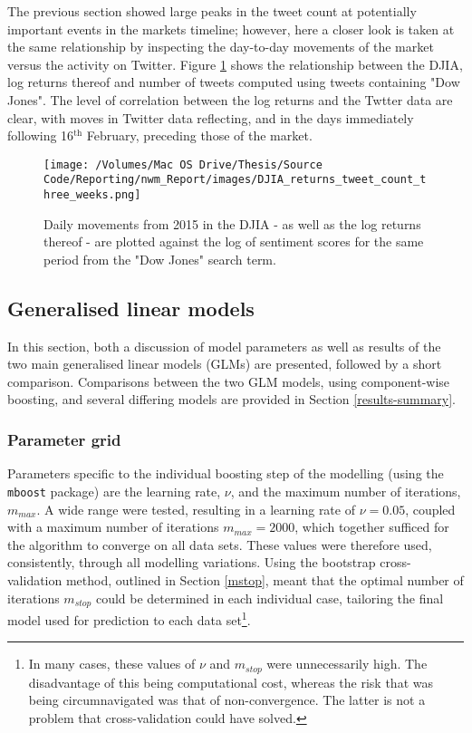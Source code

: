\documentclass{article}
\begin{document}
The previous section showed large peaks in the tweet count at potentially important events in the markets timeline; however, here a closer look is taken at the same relationship by inspecting the day-to-day movements of the market versus the activity on Twitter. Figure \ref{fig:day-to-day} shows the relationship between the DJIA, log returns thereof and number of tweets computed using tweets containing "Dow Jones". The level of correlation between the log returns and the Twtter data are clear, with moves in Twitter data reflecting, and in the days immediately following 16$^{\text{th}}$ February, preceding those of the market.

\begin{figure}[htb]
\centering
\texttt{[image: /Volumes/Mac OS Drive/Thesis/Source Code/Reporting/nwm\_Report/images/DJIA\_returns\_tweet\_count\_three\_weeks.png]}
\caption[DJIA log-returns plotted alongside the logarithm of tweet counts]{\label{fig:day-to-day}Daily movements from 2015 in the DJIA - as well as the log returns thereof - are plotted against the log of sentiment scores for the same period from the "Dow Jones" search term.}
\end{figure}

\pagebreak


\subsection{Generalised linear models \label{main-modelling}}
\label{sec-6-4}

In this section, both a discussion of model parameters as well as results of the two main generalised linear models (GLMs) are presented, followed by a short comparison. Comparisons between the two GLM models, using component-wise boosting, and several differing models are provided in Section \ref{results-summary}.


\subsubsection{Parameter grid \label{param-grid}}
\label{sec-6-4-1}

Parameters specific to the individual boosting step of the modelling (using the \texttt{mboost} package) are the learning rate, $\nu$, and the maximum number of iterations, $m_{max}$. A wide range were tested, resulting in a learning rate of $\nu = 0.05$, coupled with a maximum number of iterations $m_{max} = 2000$, which together sufficed for the algorithm to converge on all data sets. These values were therefore used, consistently, through all modelling variations. Using the bootstrap cross-validation method, outlined in Section \ref{mstop}, meant that the optimal number of iterations $m_{stop}$ could be determined in each individual case, tailoring the final model used for prediction to each data set\footnote{In many cases, these values of $\nu$ and $m_{stop}$ were unnecessarily high. The disadvantage of this being computational cost, whereas the risk that was being circumnavigated was that of non-convergence. The latter is not a problem that cross-validation could have solved.}.
\end{document}
